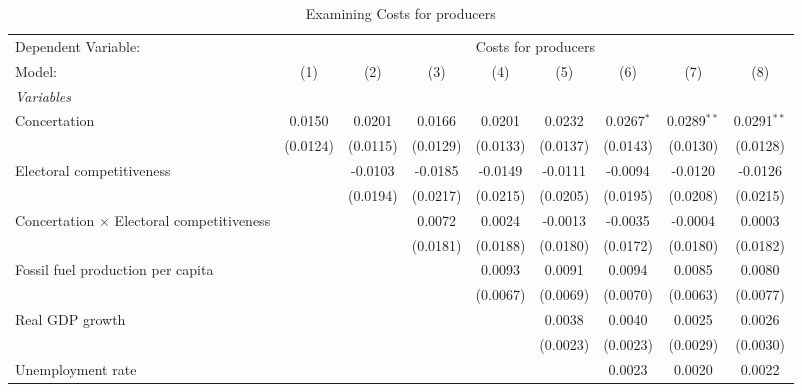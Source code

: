 
\begin{table}[htbp]
   \caption{Examining Costs for producers}
   \centering
   \begin{tabular}{lcccccccc}
      \tabularnewline \midrule \midrule
      Dependent Variable: & \multicolumn{8}{c}{Costs for producers}\\
      Model:                                           & (1)      & (2)      & (3)      & (4)      & (5)      & (6)          & (7)           & (8)\\  
      \midrule
      \emph{Variables}\\
      Concertation                                     & 0.0150   & 0.0201   & 0.0166   & 0.0201   & 0.0232   & 0.0267$^{*}$ & 0.0289$^{**}$ & 0.0291$^{**}$\\   
                                                       & (0.0124) & (0.0115) & (0.0129) & (0.0133) & (0.0137) & (0.0143)     & (0.0130)      & (0.0128)\\   
      Electoral competitiveness                        &          & -0.0103  & -0.0185  & -0.0149  & -0.0111  & -0.0094      & -0.0120       & -0.0126\\   
                                                       &          & (0.0194) & (0.0217) & (0.0215) & (0.0205) & (0.0195)     & (0.0208)      & (0.0215)\\   
      Concertation $\times$ Electoral competitiveness  &          &          & 0.0072   & 0.0024   & -0.0013  & -0.0035      & -0.0004       & 0.0003\\   
                                                       &          &          & (0.0181) & (0.0188) & (0.0180) & (0.0172)     & (0.0180)      & (0.0182)\\   
      Fossil fuel production per capita                &          &          &          & 0.0093   & 0.0091   & 0.0094       & 0.0085        & 0.0080\\   
                                                       &          &          &          & (0.0067) & (0.0069) & (0.0070)     & (0.0063)      & (0.0077)\\   
      Real GDP growth                                  &          &          &          &          & 0.0038   & 0.0040       & 0.0025        & 0.0026\\   
                                                       &          &          &          &          & (0.0023) & (0.0023)     & (0.0029)      & (0.0030)\\   
      Unemployment rate                                &          &          &          &          &          & 0.0023       & 0.0020        & 0.0022\\   

\end{tabular}
\end{table}
